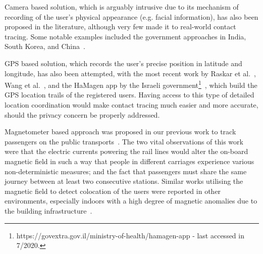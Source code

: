 \documentclass[graybox]{svmult}
\begin{document}
Camera based solution, which is arguably intrusive due to its mechanism of recording of the user's physical appearance (e.g. facial information), has also been proposed in the literature, although very few made it to real-world contact tracing. Some notable examples included the government approaches in India, South Korea, and China~\cite{preethika2020artificial,seetharaman74867177countries,tabari2020nations,vaughan2020tracking}.

GPS based solution, which records the user's precise position in latitude and longitude, has also been attempted, with the most recent work by Raskar et al.~\cite{raskar2020apps}, Wang et al.~\cite{wang2020new}, and the HaMagen app by the Israeli government\footnote{https://govextra.gov.il/ministry-of-health/hamagen-app - last accessed in 7/2020.}~\cite{sonmezdigital}, which build the GPS location trails of the registered users. Having access to this type of detailed location coordination would make contact tracing much easier and more accurate, should the privacy concern be properly addressed.

Magnetometer based approach was proposed in our previous work to track passengers on the public transports~\cite{nguyen2017co}. The two vital observations of this work were that the electric currents powering the rail lines would alter the on-board magnetic field in such a way that people in different carriages experience various non-deterministic measures; and the fact that passengers must share the same journey between at least two consecutive stations. Similar works utilising the magnetic field to detect colocation of the users were reported in other environments, especially indoors with a high degree of magnetic anomalies due to the building infrastructure~\cite{jeon2017judging,jeong2019smartphone,nguyen2019location}. 
\end{document}
